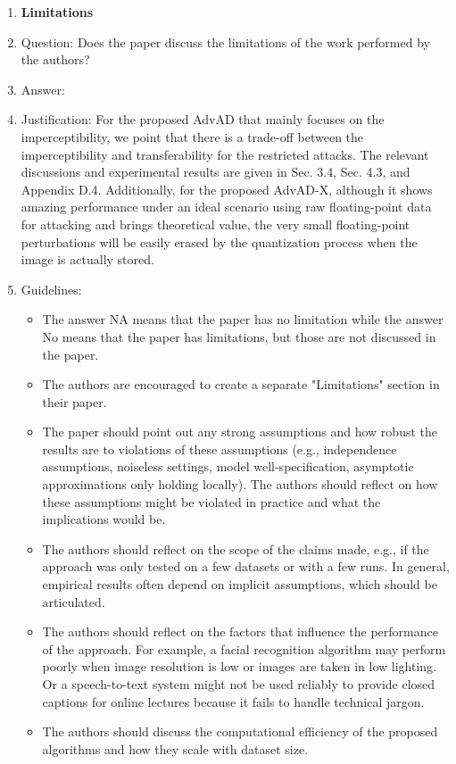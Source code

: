 \documentclass{article}
\begin{document}
\begin{enumerate}
\item {\bf Limitations}
    \item[] Question: Does the paper discuss the limitations of the work performed by the authors?
    \item[] Answer: \answerYes{} %
    \item[] Justification: For the proposed AdvAD that mainly focuses on the imperceptibility, we point that there is a trade-off between the imperceptibility and transferability for the restricted attacks. The relevant discussions and experimental results are given in Sec. 3.4, Sec. 4.3, and Appendix D.4. Additionally, for the proposed AdvAD-X, although it shows amazing performance under an ideal scenario using raw floating-point data for attacking and brings theoretical value, the very small floating-point perturbations will be easily erased by the quantization process when the image is actually stored.
    \item[] Guidelines:
    \begin{itemize}
        \item The answer NA means that the paper has no limitation while the answer No means that the paper has limitations, but those are not discussed in the paper. 
        \item The authors are encouraged to create a separate "Limitations" section in their paper.
        \item The paper should point out any strong assumptions and how robust the results are to violations of these assumptions (e.g., independence assumptions, noiseless settings, model well-specification, asymptotic approximations only holding locally). The authors should reflect on how these assumptions might be violated in practice and what the implications would be.
        \item The authors should reflect on the scope of the claims made, e.g., if the approach was only tested on a few datasets or with a few runs. In general, empirical results often depend on implicit assumptions, which should be articulated.
        \item The authors should reflect on the factors that influence the performance of the approach. For example, a facial recognition algorithm may perform poorly when image resolution is low or images are taken in low lighting. Or a speech-to-text system might not be used reliably to provide closed captions for online lectures because it fails to handle technical jargon.
        \item The authors should discuss the computational efficiency of the proposed algorithms and how they scale with dataset size.

\end{itemize}
\end{enumerate}
\end{document}
